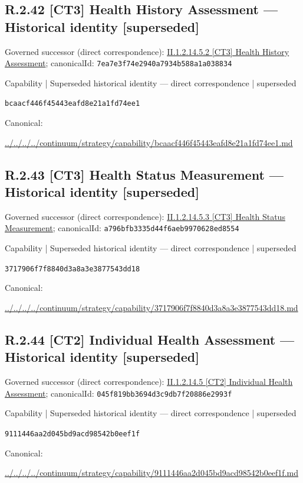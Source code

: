 \documentclass[10pt,a4paper]{article}
\begin{document}
\subsection*{R.2.42 [CT3] Health History Assessment — Historical identity [superseded]}
Governed successor (direct correspondence): \hyperref[element-7ea7e3f74e2940a7934b588a1a038834]{II.1.2.14.5.2 [CT3] Health History Assessment}; canonicalId: \texttt{7ea7e3f74e2940a7934b588a1a038834}\par
\label{element-bcaacf446f45443eafd8e21a1fd74ee1}
{\small Capability | Superseded historical identity — direct correspondence | superseded}\par
\texttt{bcaacf446f45443eafd8e21a1fd74ee1}\par
Canonical: \par
{\footnotesize\url{../../../../continuum/strategy/capability/bcaacf446f45443eafd8e21a1fd74ee1.md}}\par
\subsection*{R.2.43 [CT3] Health Status Measurement — Historical identity [superseded]}
Governed successor (direct correspondence): \hyperref[element-a796bfb3335d44f6aeb9970628ed8554]{II.1.2.14.5.3 [CT3] Health Status Measurement}; canonicalId: \texttt{a796bfb3335d44f6aeb9970628ed8554}\par
\label{element-3717906f7f8840d3a8a3e3877543dd18}
{\small Capability | Superseded historical identity — direct correspondence | superseded}\par
\texttt{3717906f7f8840d3a8a3e3877543dd18}\par
Canonical: \par
{\footnotesize\url{../../../../continuum/strategy/capability/3717906f7f8840d3a8a3e3877543dd18.md}}\par
\subsection*{R.2.44 [CT2] Individual Health Assessment — Historical identity [superseded]}
Governed successor (direct correspondence): \hyperref[element-045f819bb3694d3c9db7f20886e2993f]{II.1.2.14.5 [CT2] Individual Health Assessment}; canonicalId: \texttt{045f819bb3694d3c9db7f20886e2993f}\par
\label{element-9111446aa2d045bd9acd98542b0eef1f}
{\small Capability | Superseded historical identity — direct correspondence | superseded}\par
\texttt{9111446aa2d045bd9acd98542b0eef1f}\par
Canonical: \par
{\footnotesize\url{../../../../continuum/strategy/capability/9111446aa2d045bd9acd98542b0eef1f.md}}\par
\end{document}
